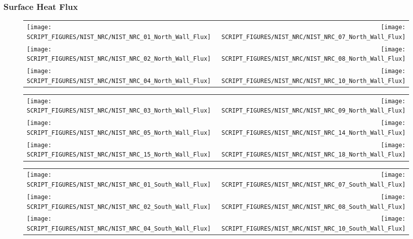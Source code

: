 \clearpage

\subsubsection{Surface Heat Flux}

\begin{figure}[!ht]
\begin{tabular*}{\textwidth}{l@{\extracolsep{\fill}}r}
\texttt{[image: SCRIPT\_FIGURES/NIST\_NRC/NIST\_NRC\_01\_North\_Wall\_Flux]} &
\texttt{[image: SCRIPT\_FIGURES/NIST\_NRC/NIST\_NRC\_07\_North\_Wall\_Flux]} \\
\texttt{[image: SCRIPT\_FIGURES/NIST\_NRC/NIST\_NRC\_02\_North\_Wall\_Flux]} &
\texttt{[image: SCRIPT\_FIGURES/NIST\_NRC/NIST\_NRC\_08\_North\_Wall\_Flux]} \\
\texttt{[image: SCRIPT\_FIGURES/NIST\_NRC/NIST\_NRC\_04\_North\_Wall\_Flux]} &
\texttt{[image: SCRIPT\_FIGURES/NIST\_NRC/NIST\_NRC\_10\_North\_Wall\_Flux]}
\end{tabular*}
\label{NIST_NRC_North_Wall_Flux_Closed}
\end{figure}

\begin{figure}[!ht]
\begin{tabular*}{\textwidth}{l@{\extracolsep{\fill}}r}
\texttt{[image: SCRIPT\_FIGURES/NIST\_NRC/NIST\_NRC\_03\_North\_Wall\_Flux]} &
\texttt{[image: SCRIPT\_FIGURES/NIST\_NRC/NIST\_NRC\_09\_North\_Wall\_Flux]} \\
\texttt{[image: SCRIPT\_FIGURES/NIST\_NRC/NIST\_NRC\_05\_North\_Wall\_Flux]} &
\texttt{[image: SCRIPT\_FIGURES/NIST\_NRC/NIST\_NRC\_14\_North\_Wall\_Flux]} \\
\texttt{[image: SCRIPT\_FIGURES/NIST\_NRC/NIST\_NRC\_15\_North\_Wall\_Flux]} &
\texttt{[image: SCRIPT\_FIGURES/NIST\_NRC/NIST\_NRC\_18\_North\_Wall\_Flux]}
\end{tabular*}
\label{NIST_NRC_North_Wall_Flux_Open}
\end{figure}

\begin{figure}[!ht]
\begin{tabular*}{\textwidth}{l@{\extracolsep{\fill}}r}
\texttt{[image: SCRIPT\_FIGURES/NIST\_NRC/NIST\_NRC\_01\_South\_Wall\_Flux]} &
\texttt{[image: SCRIPT\_FIGURES/NIST\_NRC/NIST\_NRC\_07\_South\_Wall\_Flux]} \\
\texttt{[image: SCRIPT\_FIGURES/NIST\_NRC/NIST\_NRC\_02\_South\_Wall\_Flux]} &
\texttt{[image: SCRIPT\_FIGURES/NIST\_NRC/NIST\_NRC\_08\_South\_Wall\_Flux]} \\
\texttt{[image: SCRIPT\_FIGURES/NIST\_NRC/NIST\_NRC\_04\_South\_Wall\_Flux]} &
\texttt{[image: SCRIPT\_FIGURES/NIST\_NRC/NIST\_NRC\_10\_South\_Wall\_Flux]}
\end{tabular*}
\label{NIST_NRC_South_Wall_Flux_Closed}
\end{figure}

